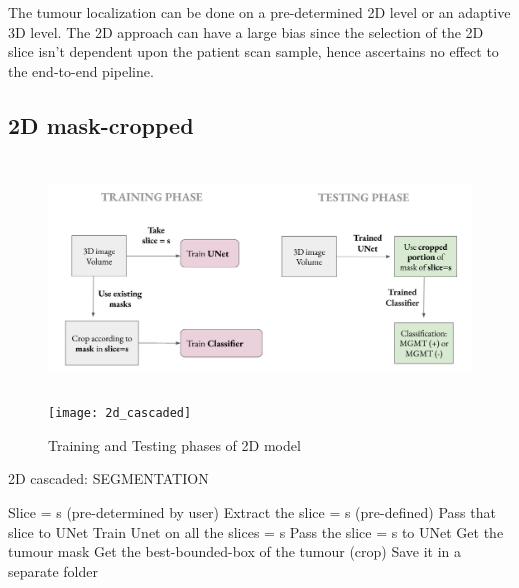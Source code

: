 The tumour localization can be done on a pre-determined 2D level or an adaptive 3D level. The 2D approach can have a large bias since the selection of the 2D slice isn't dependent upon the patient scan sample, hence ascertains no effect to the end-to-end pipeline.
\subsection{2D mask-cropped}\label{2D_cropped}
\vspace*{1mm}

\begin{figure}[H]
  \begin{center}
    \leavevmode
    \ifpdf
      \includegraphics[height=2.5in]{Methodology/Chapter3Figs/2D_cascaded.png}
    \else
      \texttt{[image: 2d\_cascaded]}
    \fi
    \caption{Training and Testing phases of 2D model}
    \label{2d_cascaded}
  \end{center}
\end{figure}




\begin{algorithm}[H]
\caption{2D cascaded: SEGMENTATION}\label{alg:2D_cascaded_1}
\begin{algorithmic}[1]
\vspace*{4mm}
\Require Slice = s (pre-determined by user)
        \State Extract the slice = s (pre-defined)
        \State Pass that slice to UNet 
        \State Train Unet on all the slices = s 
\EndFor
\State
{}
    \State Pass the slice = s to UNet
    \State Get the tumour mask
    \State Get the best-bounded-box of the tumour (crop)
    \State Save it in a separate folder
\EndFor

\end{algorithmic}
\end{algorithm}


